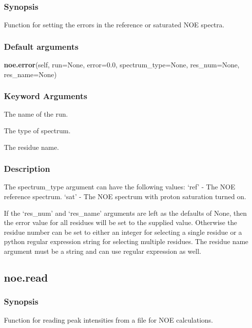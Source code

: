 \subsubsection{Synopsis}

Function for setting the errors in the reference or saturated NOE spectra.

\subsubsection{Default arguments}

\textsf{\textbf{noe.error}(self, run=None, error=0.0, spectrum\_type=None, res\_num=None, res\_name=None)}


\subsubsection{Keyword Arguments}

  The name of the run.

  The type of spectrum.

  The residue name.

\subsubsection{Description}

The spectrum\_type argument can have the following values:
    `ref' - The NOE reference spectrum.
    `sat' - The NOE spectrum with proton saturation turned on.

If the `res\_num' and `res\_name' arguments are left as the defaults of None, then the error
value for all residues will be set to the supplied value.  Otherwise the residue number can
be set to either an integer for selecting a single residue or a python regular expression
string for selecting multiple residues.  The residue name argument must be a string and can
use regular expression as well.


\newpage

\subsection{noe.read}


\subsubsection{Synopsis}

Function for reading peak intensities from a file for NOE calculations.

